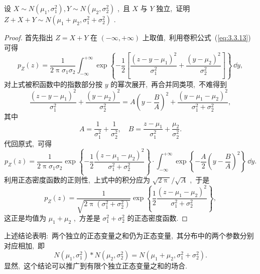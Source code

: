    \begin{example}[(正态分布的可加性)]\label{exam:3.3.6}
   	设 $X\sim N(\mu_1,\sigma_1^2),Y\sim N(\mu_2,\sigma_2^2)$ ,\ 且 $X$ 与 $Y$ 独立,\ 证明 $Z+X+Y\sim N(\mu_1+\mu_2,\sigma_1^2+\sigma_2^2)$ .
   	\begin{proof}
   		首先指出 $Z=X+Y$ 在 $(-\infty,+\infty)$ 上取值,\ 利用卷积公式~(\ref{eq:3.3.13})可得
   		\begin{equation*}
   			p_Z(z)=\frac{1}{2\uppi\sigma_1\sigma_2}\int_{-\infty}^{+\infty}\exp\left\{-\frac{1}{2}\left[\frac{(z-y-\mu_1)^2}{\sigma_1^2}+\frac{(y-\mu_2)^2}{\sigma_2^2}\right]\right\}\,\dd y,
   		\end{equation*}
   		对上式被积函数中的指数部分按 $y$ 的幂次展开,\ 再合并同类项,\ 不难得到
   		\begin{equation*}
   			\frac{(z-y-\mu_1)^2}{\sigma_1^2}+\frac{(y-\mu_2)^2}{\sigma_2^2}=A\left(y-\frac{B}{A}\right)^2+\frac{(y-\mu_1-\mu_2)^2}{\sigma_1^2+\sigma_2^2},
   		\end{equation*}
   		其中
   		\begin{equation*}
   			A=\frac{1}{\sigma_1^2}+\frac{1}{\sigma_2^2},\quad B=\frac{z-\mu_1}{\sigma_1^2}+\frac{\mu_2}{\sigma_2^2}.
   		\end{equation*}
   		代回原式,\ 可得
   		\begin{equation*}
   			p_Z(z)=\frac{1}{2\uppi\sigma_1\sigma_2}\exp\left\{-\frac{1}{2}\frac{(z-\mu_1-\mu_2)^2}{\sigma_1^2+\sigma_2^2}\right\}\cdot\int_{-\infty}^{+\infty}\exp\left\{-\frac{A}{2}\left(y-\frac{B}{A}\right)^2\right\}\,\dd y.
   		\end{equation*}
   		利用正态密度函数的正则性,\ 上式中的积分应为 $\sqrt{2\uppi}/\sqrt{A}$ ,\ 于是
   		\begin{equation*}
   			p_Z(z)=\frac{1}{\sqrt{2\uppi(\sigma_1^2+\sigma_2^2)}}\exp\left\{\frac{1}{2}\frac{(z-\mu_1-\mu_2)^2}{\sigma_1^2+\sigma_2^2}\right\},
   		\end{equation*}
   		这正是均值为 $\mu_1+\mu_2$ ,\ 方差是 $\sigma_1^2+\sigma_2^2$ 的正态密度函数.
   	\end{proof}
   \end{example}
   上述结论表明:\ 两个独立的正态变量之和仍为正态变量,\ 其分布中的两个参数分别对应相加,\ 即
   \begin{equation}\label{eq:3.3.14}
   	N(\mu_1,\sigma_1^2)\ast N(\mu_2,\sigma_2^2)=N(\mu_1+\mu_2,\sigma_1^2+\sigma_2^2).
   \end{equation}
   显然,\ 这个结论可以推广到有限个独立正态变量之和的场合.
   
